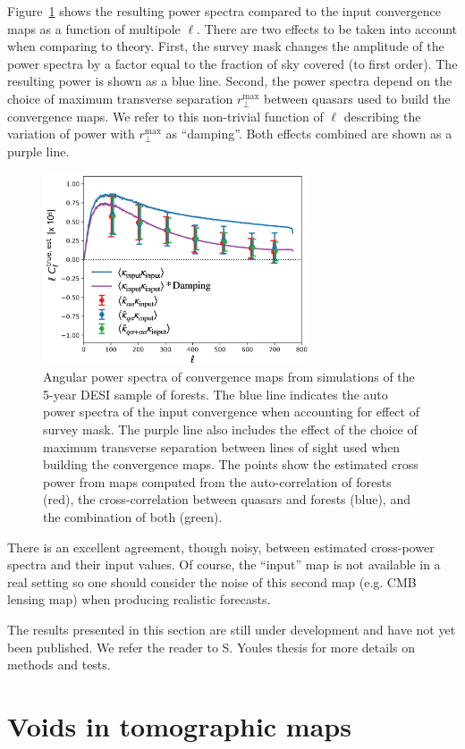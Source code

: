 Figure~\ref{fig:forest_lensing_power_spectra} shows the resulting power spectra
compared to the input convergence maps as a function of multipole $\ell$. 
There are two effects to be taken into account when comparing to theory. 
First, the survey mask changes the amplitude of the power spectra by a factor equal 
to the fraction of sky covered (to first order). The resulting power is shown as a blue line. 
Second, the power spectra depend on the choice of maximum transverse separation $r_\perp^\mathrm{max}$ 
between quasars used to build the convergence maps. 
We refer to this non-trivial function of $\ell$ describing 
the variation of power with $r_\perp^\mathrm{max}$
as ``damping''. Both effects combined are shown as a purple line.


\begin{figure}
    \centering
    \includegraphics[width=0.7\textwidth]{fig/forests/forest_lensing_power_spectra.png}
    \caption{Angular power spectra of convergence maps from simulations of the 5-year DESI sample of \lya forests. 
    The blue line indicates the auto power spectra of the input convergence when 
    accounting for effect of survey mask. The purple line also includes the effect of 
    the choice of maximum transverse separation between lines of sight used when 
    building the convergence maps. The points show the estimated cross power 
    from maps computed from the auto-correlation of forests (red), the cross-correlation 
    between quasars and forests (blue), and the combination of both (green). 
    }
    \label{fig:forest_lensing_power_spectra}
\end{figure}

There is an excellent agreement, though noisy, between estimated cross-power spectra  
and their input values. Of course, the ``input'' map is not available in a real setting 
so one should consider the noise of this second map (e.g. CMB lensing map) when producing
realistic forecasts. 

The results presented in this section are still under development and have not yet  
been published. We refer the reader to S. Youles thesis for more details on methods 
and tests. 




\section{Voids in tomographic maps}
\label{forests:voids}

\cite{ravouxFirstMeasurementCorrelation2022}


